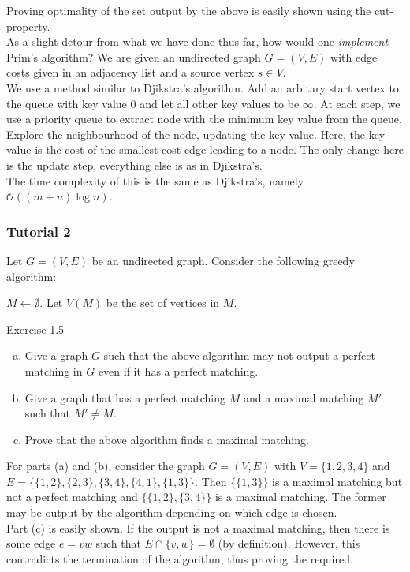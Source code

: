 Proving optimality of the set output by the above is easily shown using the cut-property.\\

As a slight detour from what we have done thus far, how would one \textit{implement} Prim's algorithm? We are given an undirected graph $G=(V,E)$ with edge costs given in an adjacency list and a source vertex $s\in V$.\\
We use a method similar to Djikstra's algorithm. Add an arbitary start vertex to the queue with key value $0$ and let all other key values to be $\infty$. At each step, we use a priority queue to extract node with the minimum key value from the queue. Explore the neighbourhood of the node, updating the key value. Here, the key value is the cost of the smallest cost edge leading to a node. The only change here is the update step, everything else is as in Djikstra's.\\
The time complexity of this is the same as Djikstra's, namely $\mathcal{O}((m+n)\log n)$.

\subsubsection{Tutorial 2}

\begin{exercise}
	Let $G=(V,E)$ be an undirected graph. Consider the following greedy algorithm:
	\begin{algorithm*}
		\DontPrintSemicolon
		\SetNoFillComment
		$M\gets\emptyset$. Let $V(M)$ be the set of vertices in $M$.\;
		\caption{Exercise 1.5}\label{algo: ex 1.5}
	\end{algorithm*}

	\begin{enumerate}[(a)]
		\item Give a graph $G$ such that the above algorithm may not output a perfect matching in $G$ even if it has a perfect matching.
		\item Give a graph that has a perfect matching $M$ and a maximal matching $M'$ such that $M'\neq M$.
		\item Prove that the above algorithm finds a maximal matching.
	\end{enumerate}
\end{exercise}
\begin{solution}
	For parts (a) and (b), consider the graph $G=(V,E)$ with $V=\{1,2,3,4\}$ and $E=\{\{1,2\},\{2,3\},\{3,4\},\{4,1\},\{1,3\}\}$. Then $\{\{1,3\}\}$ is a maximal matching but not a perfect matching and $\{\{1,2\},\{3,4\}\}$ is a maximal matching. The former may be output by the algorithm depending on which edge is chosen.\\
	Part (c) is easily shown. If the output is not a maximal matching, then there is some edge $e=vw$ such that $E\cap\{v,w\}=\emptyset$ (by definition). However, this contradicts the termination of the algorithm, thus proving the required.
\end{solution}

